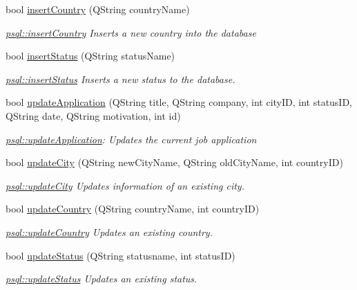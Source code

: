 \begin{DoxyCompactItemize}
bool \mbox{\hyperlink{classpsql_ab3b5934ce3fbc4be1730d990d4142893}{insert\+Country}} (Q\+String country\+Name)
\begin{DoxyCompactList}\small\item\em \mbox{\hyperlink{classpsql_ab3b5934ce3fbc4be1730d990d4142893}{psql\+::insert\+Country}} Inserts a new country into the database \end{DoxyCompactList}\item 
bool \mbox{\hyperlink{classpsql_a601ee0bdc9430b1d674a857f7c94b767}{insert\+Status}} (Q\+String status\+Name)
\begin{DoxyCompactList}\small\item\em \mbox{\hyperlink{classpsql_a601ee0bdc9430b1d674a857f7c94b767}{psql\+::insert\+Status}} Inserts a new status to the database. \end{DoxyCompactList}\item 
bool \mbox{\hyperlink{classpsql_a836eea3c6deb2d6a3a357193a99d6ee7}{update\+Application}} (Q\+String title, Q\+String company, int city\+ID, int status\+ID, Q\+String date, Q\+String motivation, int id)
\begin{DoxyCompactList}\small\item\em \mbox{\hyperlink{classpsql_a836eea3c6deb2d6a3a357193a99d6ee7}{psql\+::update\+Application}}\+: Updates the current job application \end{DoxyCompactList}\item 
bool \mbox{\hyperlink{classpsql_af2d88341e21459895470da26fa1826f0}{update\+City}} (Q\+String new\+City\+Name, Q\+String old\+City\+Name, int country\+ID)
\begin{DoxyCompactList}\small\item\em \mbox{\hyperlink{classpsql_af2d88341e21459895470da26fa1826f0}{psql\+::update\+City}} Updates information of an existing city. \end{DoxyCompactList}\item 
bool \mbox{\hyperlink{classpsql_ae662278c5fb8ff3471ee1442e69482e2}{update\+Country}} (Q\+String country\+Name, int country\+ID)
\begin{DoxyCompactList}\small\item\em \mbox{\hyperlink{classpsql_ae662278c5fb8ff3471ee1442e69482e2}{psql\+::update\+Country}} Updates an existing country. \end{DoxyCompactList}\item 
bool \mbox{\hyperlink{classpsql_a620364c99c98e20720908deb045536a0}{update\+Status}} (Q\+String statusname, int status\+ID)
\begin{DoxyCompactList}\small\item\em \mbox{\hyperlink{classpsql_a620364c99c98e20720908deb045536a0}{psql\+::update\+Status}} Updates an existing status. \end{DoxyCompactList}\item 

\end{DoxyCompactItemize}
